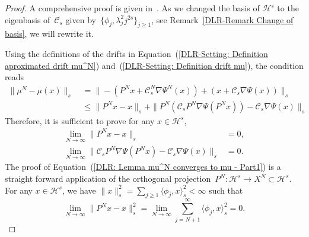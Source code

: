 \begin{proof}
  A comprehensive proof is given in~\autocite{Pillai2012}. As we changed the basis of $\mathcal{H}^s$ to the eigenbasis of~$\mathcal{C}_s$ given by~$\{ \phi_j, \lambda_j^2 j^{2s} \}_{j \geq 1}$, see Remark~\ref{DLR-Remark Change of basis}, we will rewrite it.
  
  Using the definitions of the drifts in Equation~(\ref{DLR-Setting: Definition aproximated drift mu^N}) and~(\ref{DLR-Setting: Definition drift mu}), the condition reads
  \begin{equation*}
    \begin{split}
      \| \mu^N - \mu(x) \|_s & \; = \| -  (P^Nx + \mathcal{C}_s^N \nabla \Psi^N(x)) + (x + \mathcal{C}_s \nabla \Psi(x))  \|_s \\
      & \; \leq \| P^N x - x \|_s + \| P^N ( \mathcal{C}_s P^N \nabla  \Psi(P^Nx) ) - \mathcal{C}_s \nabla \Psi(x) \|_s
    \end{split}
  \end{equation*}
  Therefore, it is sufficient to prove for any $x \in \mathcal{H}^s$,
  \begin{align}
    \label{DLR: Lemma mu^N converges to mu - Part1}
    \lim_{N \to \infty}  \| P^N x - x \|_s &  = 0, \\
    \label{DLR: Lemma mu^N converges to mu - Part2}
    \lim_{N \to \infty}  \|  \mathcal{C}_s P^N \nabla  \Psi(P^Nx)  - \mathcal{C}_s \nabla \Psi(x) \|_s & = 0.
  \end{align}
  The proof of Equation~(\ref{DLR: Lemma mu^N converges to mu - Part1}) is a straight forward application of the orthogonal projection~$P^N: \mathcal{H}^s \to X^N \subset \mathcal{H}^s$. For any $x \in \mathcal{H}^s$, we have $ \| x \|_s^2 = \sum_{j\geq1} \langle \phi_j, x \rangle_s^2 < \infty $ such that 
  \begin{equation}
    \label{DLR: Lemma mu^N converge to mu - Projection}
    \lim_{N \to \infty}  \| P^N x - x \|_s^2 = \lim_{N \to \infty} \sum_{j = N +1}^{\infty} \langle \phi_j, x \rangle_s^2 = 0.
  \end{equation}
  

\end{proof}
